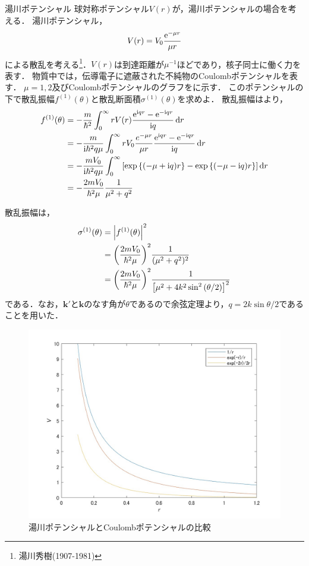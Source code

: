 \documentclass{report}
\begin{document}
  \begin{myex}{湯川ポテンシャル}{}
    球対称ポテンシャル$V(r)$が，湯川ポテンシャルの場合を考える．
    湯川ポテンシャル，
    \begin{align}
      V(r) = V_0 \frac{\mathrm{e}^{-\mu r}}{\mu r}
    \end{align}
    による散乱を考える\footnote{湯川秀樹(1907-1981)}．$V(r)$は到達距離が$\mu^{-1}$ほどであり，核子同士に働く力を表す．
    物質中では，伝導電子に遮蔽された不純物のCoulombポテンシャルを表す．
    $\mu = 1,2$及びCoulombポテンシャルのグラフをに示す．
    このポテンシャルの下で散乱振幅$f^{(1)}(\theta)$と散乱断面積$\sigma^{(1)}(\theta)$を求めよ．
    \tcblower
    散乱振幅はより，
    \begin{align}
      f^{(1)}(\theta) &= -\frac{m}{\hbar^2} \int_{0}^{\infty} rV(r) \frac{\mathrm{e}^{\mathrm{i} qr} - \mathrm{e}^{-\mathrm{i} qr}}{\mathrm{i} q} \dd{r} \\ 
      &= -\frac{m}{\mathrm{i} \hbar^2 q \mu} \int_{0}^{\infty} rV_0\frac{e^{-\mu r}}{\mu r} \frac{\mathrm{e}^{\mathrm{i} qr} - \mathrm{e}^{-\mathrm{i} qr}}{\mathrm{i} q}\dd{r} \\
      &= -\frac{mV_0}{\mathrm{i} \hbar^2 q \mu} \int_{0}^{\infty} \qty[\exp\qty{(-\mu + \mathrm{i}q)r} - \exp\qty{(-\mu - \mathrm{i}q)r}] \dd{r} \\
      &= - \frac{2m V_0}{\hbar^2 \mu} \frac{1}{\mu^2 + q^2}
    \end{align}
    \par
    散乱振幅は，
    \begin{align}
      \sigma^{(1)}(\theta) &= \abs{f^{(1)}(\theta)}^2\\
      &= \qty(\frac{2m V_0}{\hbar^2 \mu})^2 \frac{1}{(\mu^2 + q^2)^2}\\
      &= \qty(\frac{2m V_0}{\hbar^2 \mu})^2 \frac{1}{\qty[\mu^2 + 4k^2 \sin^2\qty(\theta/2)]^2}
    \end{align}
    である．なお，$\bm{k'}$と$\bm{k}$のなす角が$\theta$であるので余弦定理より，$q = 2k\sin\theta/2$であることを用いた．
    \begin{figure}[H]
      \centering
      \includegraphics[width = 0.5\columnwidth]{fig/yukawa_potential.jpg}
      \caption{湯川ポテンシャルとCoulombポテンシャルの比較}\label{yukawa-potential-graph}
    \end{figure}
  \end{myex}
\end{document}
